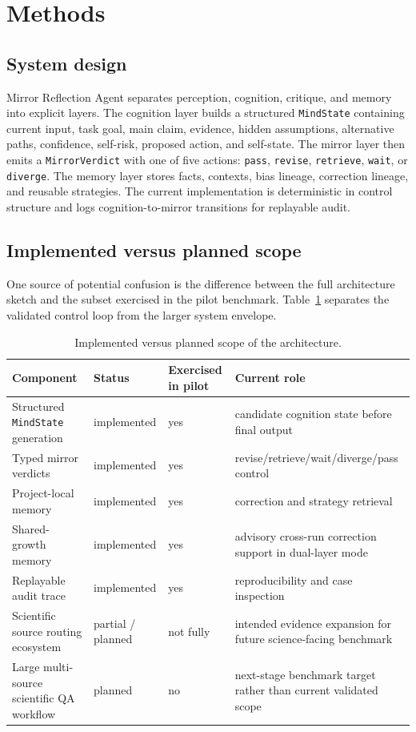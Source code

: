 \documentclass[12pt]{article}
\begin{document}
\section{Methods}

\subsection{System design}

Mirror Reflection Agent separates perception, cognition, critique, and memory into explicit layers. The cognition layer builds a structured \texttt{MindState} containing current input, task goal, main claim, evidence, hidden assumptions, alternative paths, confidence, self-risk, proposed action, and self-state. The mirror layer then emits a \texttt{MirrorVerdict} with one of five actions: \texttt{pass}, \texttt{revise}, \texttt{retrieve}, \texttt{wait}, or \texttt{diverge}. The memory layer stores facts, contexts, bias lineage, correction lineage, and reusable strategies. The current implementation is deterministic in control structure and logs cognition-to-mirror transitions for replayable audit.

\subsection{Implemented versus planned scope}

One source of potential confusion is the difference between the full architecture sketch and the subset exercised in the pilot benchmark. Table~\ref{tab:implemented-v3} separates the validated control loop from the larger system envelope.

\begin{table}[H]
\centering
\begin{tabular}{p{4.0cm}p{2.2cm}p{2.2cm}p{4.8cm}}
\toprule
Component & Status & Exercised in pilot & Current role \\
\midrule
Structured \texttt{MindState} generation & implemented & yes & candidate cognition state before final output \\
Typed mirror verdicts & implemented & yes & revise/retrieve/wait/diverge/pass control \\
Project-local memory & implemented & yes & correction and strategy retrieval \\
Shared-growth memory & implemented & yes & advisory cross-run correction support in dual-layer mode \\
Replayable audit trace & implemented & yes & reproducibility and case inspection \\
Scientific source routing ecosystem & partial / planned & not fully & intended evidence expansion for future science-facing benchmark \\
Large multi-source scientific QA workflow & planned & no & next-stage benchmark target rather than current validated scope \\
\bottomrule
\end{tabular}
\caption{Implemented versus planned scope of the architecture.}
\label{tab:implemented-v3}
\end{table}
\end{document}
